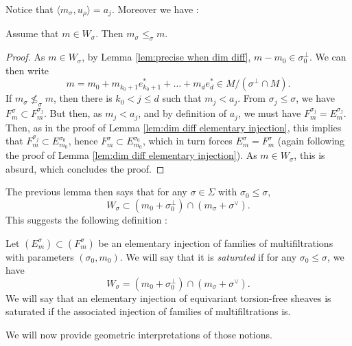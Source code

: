 \documentclass[a4paper,10pt]{amsart}
\theoremstyle{plain}{
    \newtheorem{theorem}{Theorem}[section]
    \newtheorem{lemma}[theorem]{Lemma}
    \newtheorem{corollary}[theorem]{Corollary}
    \newtheorem{proposition}[theorem]{Proposition}
    \newtheorem{conjecture}[theorem]{Conjecture}
}
\theoremstyle{definition}{
    \newtheorem{definition}[theorem]{Definition}
    \newtheorem{defn-thm}[theorem]{Definition-Theorem}
    \newtheorem{example}[theorem]{Example}
    \newtheorem{notation}[theorem]{Notation}
}
\theoremstyle{remark}{
    \newtheorem{remark}[theorem]{Remark}
    \newtheorem{problem}[theorem]{Problem}
    \newtheorem{question}[theorem]{Question}
}
\begin{document}
Notice that $\langle m_\sigma,u_\rho\rangle=a_j$. Moreover we have :
\begin{lemma}
 \label{lem:localization diff dim}
 Assume that $m\in W_\sigma$. Then $m_\sigma\leq_\sigma m$.
\end{lemma}
\begin{proof}
As $m\in W_\sigma$, by Lemma \ref{lem:precise when dim diff}, $m-m_0\in\sigma_0^\perp$. We can then 
write 
$$
m=m_0+m_{k_0+1}e_{k_0+1}^*+\ldots+m_d e_d^*\in M/(\sigma^\perp\cap M).
$$
If $m_\sigma\nleq_\sigma m$, then there is $k_0<j\leq d$ such that $m_j < a_j$. From $\sigma_j\leq \sigma$, we have 
$F^\sigma_m\subset F^{\sigma_j}_m$. But then, as $m_j<a_j$, and by definition of $a_j$, we must have $F^{\sigma_j}_m=E^{\sigma_j}_m$. Then, as in the proof of Lemma \ref{lem:dim diff elementary injection}, this implies that $F^{\sigma_j}_m\subset E_{m_0}^{\sigma_0}$, hence $F^{\sigma}_m\subset E_{m_0}^{\sigma_0}$, which in turn forces $E^{\sigma}_m=F^\sigma_m$ (again following the proof of Lemma \ref{lem:dim diff elementary injection}). As $m\in W_\sigma$, this is absurd, which concludes the proof.
\end{proof}
The previous lemma then says that for any $\sigma\in\Sigma$ with $\sigma_0\leq \sigma$,
$$
W_\sigma\subset (m_0+\sigma_0^\perp)\cap (m_\sigma+\sigma^\vee).
$$
This suggests the following definition :
\begin{definition}
 \label{def:simple elementary injection}
 Let $(E^\sigma_m)\subset (F^\sigma_m)$ be an elementary  injection of families of multifiltrations with parameters $(\sigma_0,m_0)$. We will say that it is {\it saturated} if for any $\sigma_0\leq\sigma$, we have 
 $$
 W_\sigma= (m_0+\sigma_0^\perp)\cap (m_\sigma+\sigma^\vee).
 $$
 We will say that an elementary injection of equivariant torsion-free sheaves is saturated if the associated injection of families of multifiltrations is.
\end{definition}
We will now provide geometric interpretations of those notions.
\end{document}
